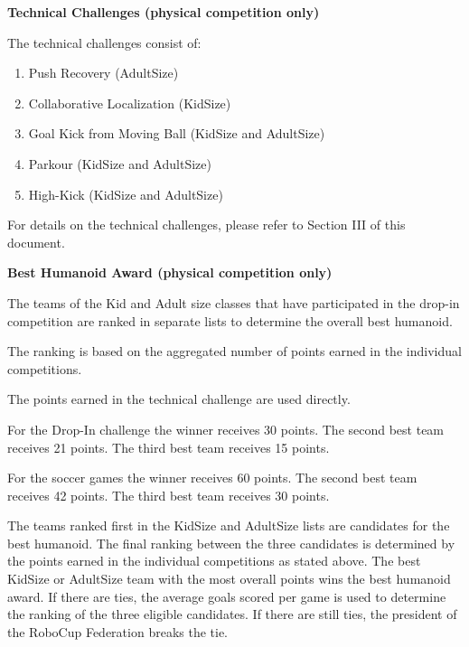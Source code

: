 \bigskip

{\bfseries Technical Challenges (physical competition only)}

\headlinebox

The technical challenges consist of:

\begin{enumerate}
\item Push Recovery (AdultSize)
\item Collaborative Localization (KidSize)
\item Goal Kick from Moving Ball (KidSize and AdultSize)
\item Parkour (KidSize and AdultSize)
\item High-Kick (KidSize and AdultSize)
\end{enumerate}

For details on the technical challenges, please refer to Section III of this document.

\bigskip

\newpage
{\bfseries Best Humanoid Award (physical competition only)}

\headlinebox
 
The teams of the Kid and Adult size classes that have
participated in the drop-in competition are ranked in separate lists to
determine the overall best humanoid.

The ranking is based on the aggregated number of points earned in the individual competitions.

\bigskip

The points earned in the technical challenge are used directly.

\bigskip

For the Drop-In challenge the winner receives 30 points. The second best team receives 21 points. The third best team receives 15 points.


\bigskip

For the soccer games the winner receives 60 points. The second best team receives 42 points. The third best team receives 30 points.

\bigskip

The teams ranked first in the KidSize and AdultSize lists
are candidates for the best humanoid.
The final ranking between the three candidates is determined by the points
earned in the individual competitions as stated above.
The best KidSize or AdultSize team with the most overall
points wins the best humanoid award.
If there are ties, the average goals scored per game is used to determine the
ranking of the three eligible candidates.
If there are still ties, the president of the RoboCup Federation breaks the tie.

